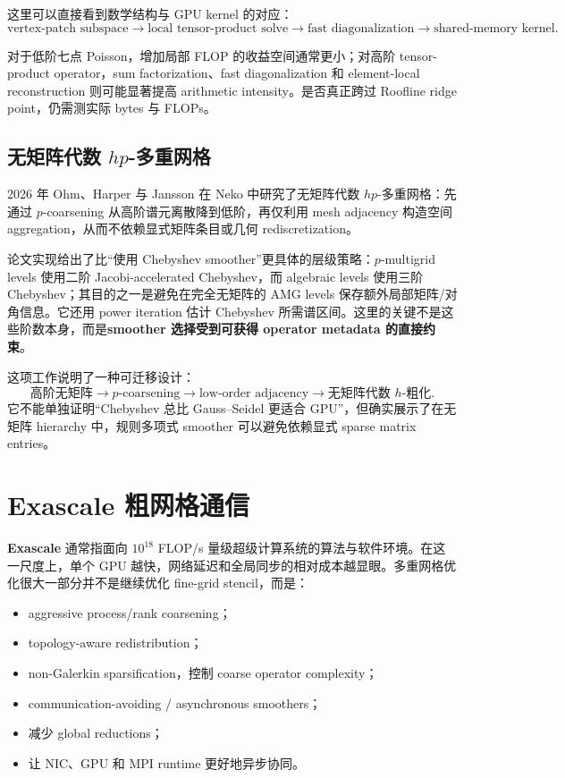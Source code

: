 这里可以直接看到数学结构与 GPU kernel 的对应：
\begin{equation}
\boxed{
\text{vertex-patch subspace}
\rightarrow
\text{local tensor-product solve}
\rightarrow
\text{fast diagonalization}
\rightarrow
\text{shared-memory kernel}.
}
\label{eq:modern-stokes-source-model}
\end{equation}

对于低阶七点 Poisson，增加局部 FLOP 的收益空间通常更小；对高阶 tensor-product operator，sum factorization、fast diagonalization 和 element-local reconstruction 则可能显著提高 arithmetic intensity。是否真正跨过 Roofline ridge point，仍需测实际 bytes 与 FLOPs。

\subsection{无矩阵代数 $hp$-多重网格}

2026 年 Ohm、Harper 与 Jansson 在 Neko 中研究了无矩阵代数 $hp$-多重网格：先通过 $p$-coarsening 从高阶谱元离散降到低阶，再仅利用 mesh adjacency 构造空间 aggregation，从而不依赖显式矩阵条目或几何 rediscretization\cite{ohm2026hpmg}。

论文实现给出了比“使用 Chebyshev smoother”更具体的层级策略：$p$-multigrid levels 使用二阶 Jacobi-accelerated Chebyshev，而 algebraic levels 使用三阶 Chebyshev；其目的之一是避免在完全无矩阵的 AMG levels 保存额外局部矩阵/对角信息。它还用 power iteration 估计 Chebyshev 所需谱区间。这里的关键不是这些阶数本身，而是\textbf{smoother 选择受到可获得 operator metadata 的直接约束}。

这项工作说明了一种可迁移设计：
\begin{equation}
\boxed{
\text{高阶无矩阵}
\rightarrow
p\text{-coarsening}
\rightarrow
\text{low-order adjacency}
\rightarrow
\text{无矩阵代数 }h\text{-粗化}.
}
\label{eq:modern-hpmg-path}
\end{equation}
它不能单独证明“Chebyshev 总比 Gauss--Seidel 更适合 GPU”，但确实展示了在无矩阵 hierarchy 中，规则多项式 smoother 可以避免依赖显式 sparse matrix entries。

\section{Exascale 粗网格通信}

\textbf{Exascale} 通常指面向 $10^{18}$ FLOP/s 量级超级计算系统的算法与软件环境。在这一尺度上，单个 GPU 越快，网络延迟和全局同步的相对成本越显眼。多重网格优化很大一部分并不是继续优化 fine-grid stencil，而是：
\begin{itemize}
\item aggressive process/rank coarsening；
\item topology-aware redistribution；
\item non-Galerkin sparsification，控制 coarse operator complexity；
\item communication-avoiding / asynchronous smoothers；
\item 减少 global reductions；
\item 让 NIC、GPU 和 MPI runtime 更好地异步协同。
\end{itemize}

